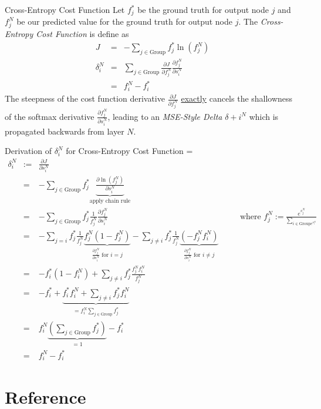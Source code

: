 \documentclass[11pt,a4paper]{article}
\begin{document}
\begin{definition}{Cross-Entropy Cost Function}
  Let $f^*_j$ be the ground truth for output node $j$ and $f_j^N$ be our predicted value for the ground truth for output node $j$. The \textit{Cross-Entropy Cost Function} is define as
  \[\begin{array}{rrl}
  J&=&-\displaystyle\sum_{j\in\text{Group}}f_j^*\ln(f_j^N)\\
  \delta_i^N&=&\displaystyle\sum_{j\in\text{Group}}\frac{\partial J}{\partial f_j^N}\frac{\partial f_j^N}{\partial s_i^N}\\
  &=&f_i^N-f_i^*
  \end{array}\]
  The steepness of the cost function derivative $\frac{\partial J}{\partial f_j^N}$ \underline{exactly} cancels the shallowness of the softmax derivative $\frac{\partial f_j^N}{\partial s_i^N}$, leading to an \textit{MSE-Style Delta} $\delta+i^N$ which is propagated backwards from layer $N$.
\end{definition}

\begin{proposition}{Derivation of $\delta_i^N$ for Cross-Entropy Cost Function}
  \everymath={\displaystyle}
  \[\begin{array}{rrlcl}
    \delta_i^N&:=&\frac{\partial J}{\partial s_i^N}&\quad&\\
    &=&-\sum_{j\in\text{Group}}f_j^*\underbrace{\frac{\partial \ln(f_j^N)}{\partial s_i^N}}_\text{apply chain rule}\\
    &=&-\sum_{j\in\text{Group}}f_j^*\frac1{f_j^N}\frac{\partial f_j^N}{\partial s_i^N}&&\text{where }f_j^N:=\frac{e^{s_j^N}}{\sum_{i\in\text{Group}e^{s_i^N}}}\\
    &=&-\sum_{j=i}f_j^*\frac1{f_j^N}\underbrace{f_j^N(1-f_j^N)}_{\frac{\partial f_j^N}{\partial s_i^N}\text{ for }i=j}-\sum_{j\neq i}f_j^*\frac1{f_j^N}\underbrace{(-f_j^Nf_i^N)}_{\frac{\partial f_j^N}{\partial s_i^N}\text{ for }i\neq j}\\
    &=&-f_i^*(1-f_i^N)+\sum_{j\neq i}f_j^*\frac{f_j^Nf_i^N}{f_j^N}\\
    &=&-f_i^*+\underbrace{f_i^*f_i^N+\sum_{j\neq i}f_j^*f_i^N}_{=f_i^N\sum_{j\in\text{Group}}f_j^*}\\
    &=&f_i^N\underbrace{\left(\sum_{j\in\text{Group}}f_j^*\right)}_{=1}-f_i^*\\
    &=&f_i^N-f_i^*
  \end{array}\]
\end{proposition}

\newpage
\setcounter{section}{-1}
\section{Reference}
\end{document}
